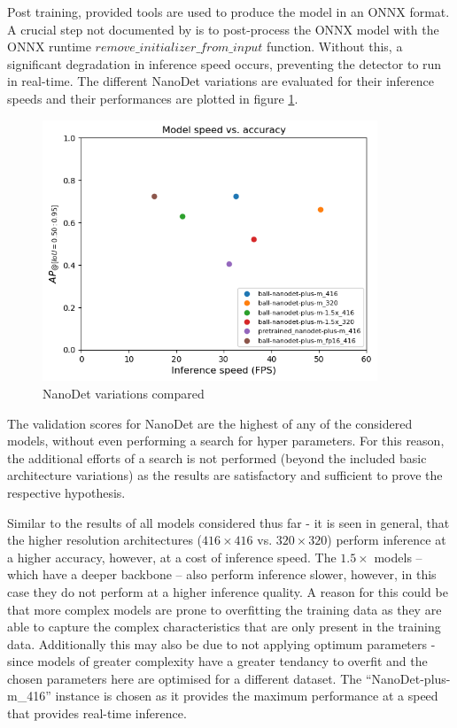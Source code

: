 \documentclass[a4paper,twoside,12pt]{report}
\begin{document}
Post training, provided tools are used to produce the model in an ONNX format. A crucial step not documented by \cite{nanodet} is to post-process the ONNX model with the ONNX runtime $remove\_initializer\_from\_input$ function. Without this, a significant degradation in inference speed occurs, preventing the detector to run in real-time. The different NanoDet variations are evaluated for their inference speeds and their performances are plotted in figure \ref{fig:nanodet_compare}.

\begin{figure}[h!]
\begin{center}
\includegraphics[width=10cm]{images/nanodet_compare.png}
\caption{NanoDet variations compared}
\label{fig:nanodet_compare}
\end{center}
\end{figure}

The validation scores for NanoDet are the highest of any of the considered models, without even performing a search for hyper parameters. For this reason, the additional efforts of a search is not performed (beyond the included basic architecture variations) as the results are satisfactory and sufficient to prove the respective hypothesis. 

Similar to the results of all models considered thus far - it is seen in general, that the higher resolution architectures ($416 \times 416$ vs. $320 \times 320$) perform inference at a higher accuracy, however, at a cost of inference speed. The $1.5\times$ models -- which have a deeper backbone -- also perform inference slower, however, in this case they do not perform at a higher inference quality. A reason for this could be that more complex models are prone to overfitting the training data as they are able to capture the complex characteristics that are only present in the training data. Additionally this may also be due to not applying optimum parameters - since models of greater complexity have a greater tendancy to overfit and the chosen parameters here are optimised for a different dataset. The ``NanoDet-plus-m\_416'' instance is chosen as it provides the maximum performance at a speed that provides real-time inference.
\end{document}
